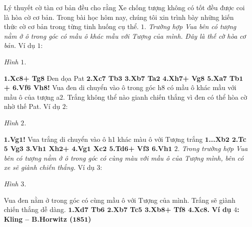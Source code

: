 \vspace*{155pt}
\begin{multicols}{2}
	Lý thuyết cờ tàn cơ bản đều cho rằng Xe chống tượng không có tốt đều được coi là hòa cờ cơ bản.
	\vskip 0.1cm
	Trong bài học hôm nay, chúng tôi xin trình bày những kiến thức cờ cơ bản trong từng tinh huống cụ thể.
	\vskip 0.1cm
	$1.$ \textit{Trường hợp Vua bên có tượng nằm ở ô trong góc có mầu ô khác mầu với Tượng của mình. Đây là thế cờ hòa cơ bản.}
	\vskip 0.1cm 
	Ví dụ $1$: 
	\begin{center}
		\newgame
		\scalebox{0.85}\showboard
		\vskip 0.1cm
		\textit{\small\color{gocco}Hình $1$.}
	\end{center}
	\textbf{\color{gocco}$\pmb{1}$.Xc$\pmb{8}$+ Tg$\pmb{8}$} Đen dọa Pat \textbf{\color{gocco}$\pmb{2}$.Xc$\pmb{7}$ Tb$\pmb{3}$ $\pmb{3}$.Xb$\pmb{7}$ Ta$\pmb{2}$ $\pmb{4}$.Xh$\pmb{7}$+ Vg$\pmb{8}$ $\pmb{5}$.Xa$\pmb{7}$ Tb$\pmb{1}$+ $\pmb{6}$.Vf$\pmb{6}$ Vh$\pmb{8}$!}
	\vskip 0.1cm
	Vua đen di chuyển vào ô trong góc h$8$ có mầu ô khác mầu với mầu ô của tượng a$2$.
	\vskip 0.1cm
	Trắng không thể  nào gianh chiến thắng vì đen có thể hòa cờ nhờ thế Pat.
	\vskip 0.1cm
	Ví dụ $2$: 
	\begin{center}
		\newgame
		\scalebox{0.85}\showboard
		\vskip 0.1cm
		\textit{\small\color{gocco}Hình $2$.}
	\end{center}
	\textbf{\color{gocco}$\pmb{1}$.Vg$\pmb{1}$!} Vua trắng di chuyển vào ô h1 khác màu ô với Tượng trắng \textbf{\color{gocco}$\pmb{1}$...Xb$\pmb{2}$ $\pmb{2}$.Tc$\pmb{5}$ Vg$\pmb{3}$ $\pmb{3}$.Vh$\pmb{1}$ Xh$\pmb{2}$+ $\pmb{4}$.Vg$\pmb{1}$ Xc$\pmb{2}$ $\pmb{5}$.Td$\pmb{6}$+ Vf$\pmb{3}$ $\pmb{6}$.Vh$\pmb{1}$}
	\vskip 0.1cm
	$2$. \textit{Trong trường hợp Vua bên có tượng nằm ở ô trong góc có cùng màu với mầu ô của Tượng mình, bên có xe sẽ  giành chiến thắng.}
	\vskip 0.1cm
	Ví dụ $3$: 
	\begin{center}
		\newgame
		\scalebox{0.85}\showboard
		\vskip 0.1cm
		\textit{\small\color{gocco}Hình $3$.}
	\end{center}
	Vua đen nằm ở trong góc có cùng mầu ô với Tượng của mình. Trắng sẽ giành chiến thắng dễ dàng.
	\vskip 0.1cm
	\textbf{\color{gocco}$\pmb{1}$.Xd$\pmb{7}$ Tb$\pmb{6}$ $\pmb{2}$.Xb$\pmb{7}$ Tc$\pmb{5}$ $\pmb{3}$.Xb$\pmb{8}$+ Tf$\pmb{8}$ $\pmb{4}$.Xc$\pmb{8}$.}
	\vskip 0.1cm
	\textbf{\color{gocco}Ví dụ $4$: Kling -- B.Horwitz ($\pmb{1851}$)}
	\begin{center}

\end{center}
\end{multicols}
